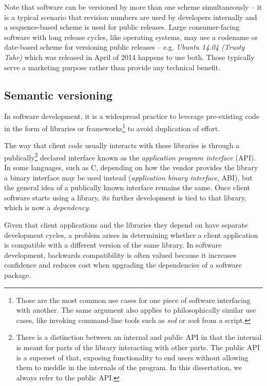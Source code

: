 \documentclass{l4proj}
\begin{document}
Note that software can be versioned by more than one scheme
simultaneously -- it is a
typical scenario that revision numbers are used by developers
internally and a sequence-based scheme is used for public releases.
Large consumer-facing software with long release cycles, like
operating systems, may use a codename or date-based scheme for
versioning public releases -- e.g. \textit{Ubuntu 14.04 (Trusty Tahr)}
which was released in April of 2014 happens to use both. Those
typically serve a marketing purpose rather than provide any technical
benefit.

\subsection{Semantic versioning}

In software development, it is a widespread practice to leverage
pre-existing code in the form of libraries or
frameworks\footnote{Those are the most common use cases for one piece
of software interfacing with another. The same argument also applies
to philosophically similar use cases, like invoking command-line tools
such as \textit{sed} or \textit{awk} from a script.} to avoid
duplication of effort.

The way that client code usually interacts with these libraries is
through a publically\footnote{There is a distinction between an
internal and public API in that the internal is meant for parts of the
library interacting with other parts. The public API is a superset of
that, exposing functionality to end users without allowing them to
meddle in the internals of the program. In this dissertation, we
always refer to the public API.} declared interface known as the
\textit{application program interface} (API). In some languages, such
as C, depending on how the vendor provides the library a binary
interface may be used instead (\textit{application binary interface},
ABI), but the general idea of a publically known interface remains the
same. Once client software starts using a library, its further
development is tied to that library, which is now a
\textit{dependency}.

Given that client applications and the libraries they depend on have
separate development cycles, a problem arises in determining whether a
client application is compatible with a different version of the same
library. In software development, backwards compatibility is often
valued because it increases confidence and reduces cost when upgrading
the dependencies of a software package.
\end{document}
